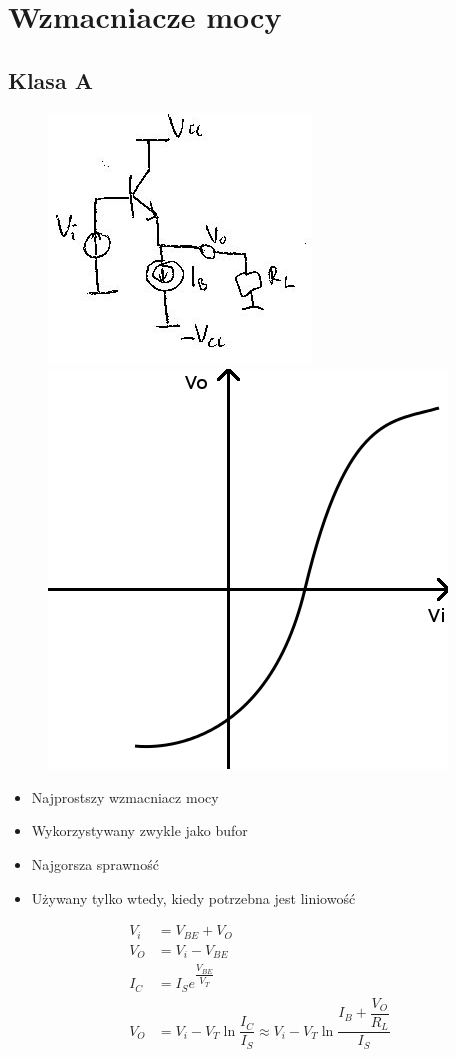 \documentclass[10pt,a4paper]{article}
\begin{document}
\section{Wzmacniacze mocy}
\subsection{Klasa A}
\begin{figure}[H]
\centering
\includegraphics[scale=1]{wzm_moc_a}
\includegraphics[scale=0.5]{wzm_moc_a_wyk}
\end{figure}
\begin{itemize}
\item{Najprostszy wzmacniacz mocy}
\item{Wykorzystywany zwykle jako bufor}
\item{Najgorsza sprawność}
\item{Używany tylko wtedy, kiedy potrzebna jest liniowość}
\end{itemize}
\begin{align*}
V_i &= V_{BE}+V_O \\
V_O&=V_i-V_{BE} \\
I_C&=I_S e^{\dfrac{V_{BE}}{V_T}} \\
V_O &= V_i -V_T \ln \dfrac{I_C}{I_S} \approx V_i - V_T \ln \dfrac{I_B + \dfrac{V_O}{R_L}}{I_S}
\end{align*}
\end{document}
